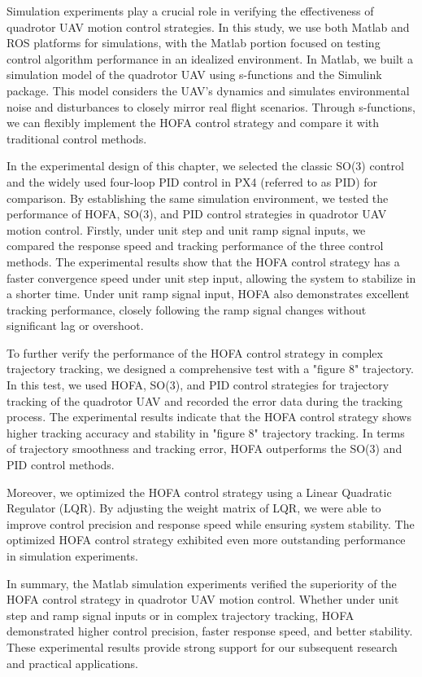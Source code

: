 \begin{digest}
  
  Simulation experiments play a crucial role in verifying the effectiveness of quadrotor UAV motion control strategies. In this study, we use both Matlab and ROS platforms for simulations, with the Matlab portion focused on testing control algorithm performance in an idealized environment. In Matlab, we built a simulation model of the quadrotor UAV using s-functions and the Simulink package. This model considers the UAV's dynamics and simulates environmental noise and disturbances to closely mirror real flight scenarios. Through s-functions, we can flexibly implement the HOFA control strategy and compare it with traditional control methods.
  
  
  In the experimental design of this chapter, we selected the classic SO(3) control and the widely used four-loop PID control in PX4 (referred to as PID) for comparison. By establishing the same simulation environment, we tested the performance of HOFA, SO(3), and PID control strategies in quadrotor UAV motion control. Firstly, under unit step and unit ramp signal inputs, we compared the response speed and tracking performance of the three control methods. The experimental results show that the HOFA control strategy has a faster convergence speed under unit step input, allowing the system to stabilize in a shorter time. Under unit ramp signal input, HOFA also demonstrates excellent tracking performance, closely following the ramp signal changes without significant lag or overshoot.
  
  
  To further verify the performance of the HOFA control strategy in complex trajectory tracking, we designed a comprehensive test with a "figure 8" trajectory. In this test, we used HOFA, SO(3), and PID control strategies for trajectory tracking of the quadrotor UAV and recorded the error data during the tracking process. The experimental results indicate that the HOFA control strategy shows higher tracking accuracy and stability in "figure 8" trajectory tracking. In terms of trajectory smoothness and tracking error, HOFA outperforms the SO(3) and PID control methods.
  
  
  Moreover, we optimized the HOFA control strategy using a Linear Quadratic Regulator (LQR). By adjusting the weight matrix of LQR, we were able to improve control precision and response speed while ensuring system stability. The optimized HOFA control strategy exhibited even more outstanding performance in simulation experiments.
  
  
  In summary, the Matlab simulation experiments verified the superiority of the HOFA control strategy in quadrotor UAV motion control. Whether under unit step and ramp signal inputs or in complex trajectory tracking, HOFA demonstrated higher control precision, faster response speed, and better stability. These experimental results provide strong support for our subsequent research and practical applications.
  

\end{digest}
